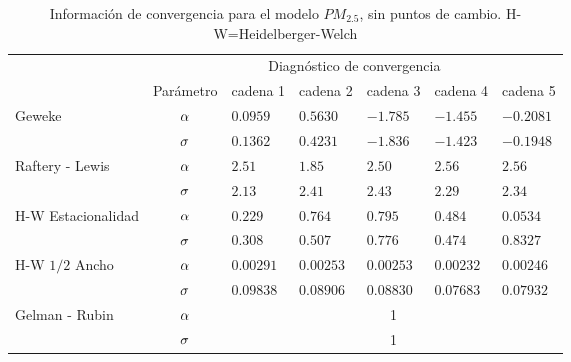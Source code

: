 \begin{table}[!h]
\centering
\begin{tabular}{|l|c|l|l|l|l|l|}
\hline
& \multicolumn{6}{|c|}{Diagnóstico de convergencia} \\
\cline{2-7}
& Parámetro & cadena 1  & cadena 2  & cadena 3 & cadena 4 & cadena 5	 \\
\hline \hline
\multirow{2}{2.5cm}{Geweke} & $\alpha$ & $0.0959$ & $0.5630$ & $-1.785$ & $-1.455$  & $ -0.2081$\\ \cline{2-7}
& $\sigma$& $0.1362$ & $0.4231$ & $-1.836$ & $-1.423 $ & $-0.1948$\\
  \cline{1-7}
\multirow{2}{2.5cm}{Raftery - Lewis} & $\alpha$ & $2.51 $& $  1.85$ & $2.50$ & $2.56  $ & $  2.56  $\\ \cline{2-7}
& $\sigma$ & \multicolumn{1}{l|}{$ 2.13$} & $2.41$ & $2.43$ & $2.29	 $ & $2.34  $ \\ \cline{1-7}
\multirow{2}{2.5cm}{H-W Estacionalidad} & $\alpha$ & $0.229  $ & $0.764 $ & $0.795$ & $0.484$ & $0.0534$ \\ \cline{2-7}
&$\sigma$ & \multicolumn{1}{l|}{$0.308 $} & $  0.507$ &  $ 0.776 $ & $ 0.474$ & $ 0.8327 $ \\ \cline{1-7}
\multirow{2}{2.5cm}{H-W $1/2$ Ancho} & $\alpha$ & $0.00291$ & $0.00253$ & $0.00253$ & $0.00232 $  & $0.00246 $  \\ \cline{2-7}
&$\sigma$ & \multicolumn{1}{l|}{$0.09838  $} & $0.08906$ & $0.08830 $ & $ 0.07683$ & $0.07932 $ \\ \cline{1-7}

\multirow{2}{2.5cm}{Gelman - Rubin} & $\alpha$ & \multicolumn{5}{|c|}{1}\\ \cline{2-7}
&$\sigma$ &  \multicolumn{5}{|c|}{1} \\ \cline{1-7}



\end{tabular}
\caption{Información de convergencia para el modelo $PM_{2.5}$, sin puntos de cambio. H-W=Heidelberger-Welch}

\label{converpm25spc}
\end{table}





